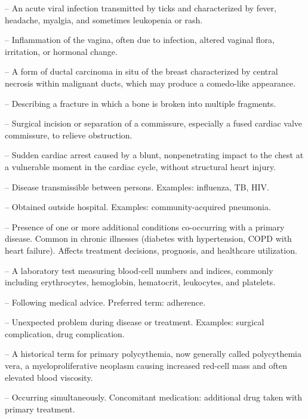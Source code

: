 -- An acute viral infection transmitted by ticks and characterized by fever, headache, myalgia, and sometimes leukopenia or rash.

-- Inflammation of the vagina, often due to infection, altered vaginal flora, irritation, or hormonal change.

-- A form of ductal carcinoma in situ of the breast characterized by central necrosis within malignant ducts, which may produce a comedo-like appearance.

-- Describing a fracture in which a bone is broken into multiple fragments.

-- Surgical incision or separation of a commissure, especially a fused cardiac valve commissure, to relieve obstruction.

-- Sudden cardiac arrest caused by a blunt, nonpenetrating impact to the chest at a vulnerable moment in the cardiac cycle, without structural heart injury.

-- Disease transmissible between persons. Examples: influenza, TB, HIV.

-- Obtained outside hospital. Examples: community-acquired pneumonia.

-- Presence of one or more additional conditions co-occurring with a primary disease. Common in chronic illnesses (diabetes with hypertension, COPD with heart failure). Affects treatment decisions, prognosis, and healthcare utilization.

-- A laboratory test measuring blood-cell numbers and indices, commonly including erythrocytes, hemoglobin, hematocrit, leukocytes, and platelets.

-- Following medical advice. Preferred term: adherence.

-- Unexpected problem during disease or treatment. Examples: surgical complication, drug complication.

-- A historical term for primary polycythemia, now generally called polycythemia vera, a myeloproliferative neoplasm causing increased red-cell mass and often elevated blood viscosity.

-- Occurring simultaneously. Concomitant medication: additional drug taken with primary treatment.

